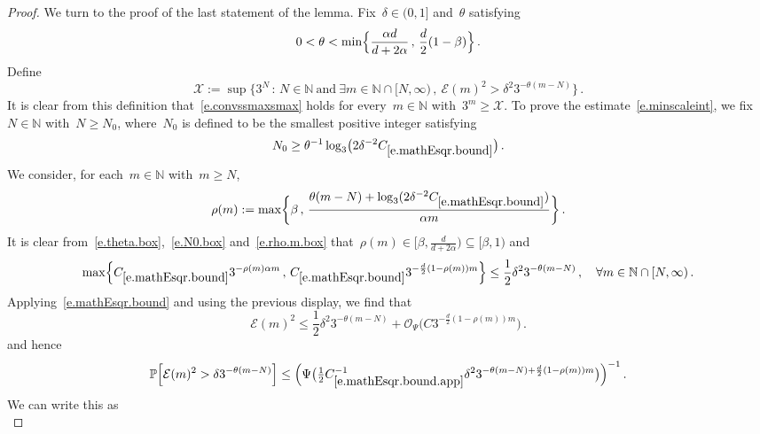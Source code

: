 \documentclass[11pt,twoside]{article} %
\numberwithin{equation}{section}
\theoremstyle{definition}
\newcommand*{\N}{\ensuremath{\mathbb{N}}}
\renewcommand{\P}{\mathbb{P}}
\newcommand{\X}{\mathcal{X}}
\renewcommand{\O}{\mathcal{O}}
\begin{document}
\begin{proof}
We turn to the proof of the last statement of the lemma. 
Fix~$\delta\in (0,1]$ and~$\theta$ satisfying 
\begin{equation}
\label{e.theta.box}
0 < \theta < 
\min \Bigl\{ 
\frac{\alpha d}{d+2\alpha} 
\,,\, 
\frac d2(1-\beta) 
\Bigr\}
\,. 
\end{equation}
Define 
\begin{equation}
\label{e.def.of.X}
\X := \sup\biggl\{ 3^N \,:\, 
N \in \N \ \mbox{and} \ 
\exists m\in\N \cap [N,\infty)
\,,\ \mathcal{E}(m)^2 >  \delta^2 3^{-\theta(m-N)}
\biggr\} \,.
\end{equation}
It is clear from this definition that~\eqref{e.convssmaxsmax} holds for every~$m\in \N$ with~$3^m\geq \X$. 
To prove the estimate~\eqref{e.minscaleint}, we 
fix~$N\in \N$ with~$N\geq N_0$, where~$N_0$ is defined to be the smallest positive integer satisfying 
\begin{equation}
\label{e.N0.box}
N_0 \geq \theta^{-1} \log_3 \bigl( 2 \delta^{-2} C_{\eqref{e.mathEsqr.bound}}\bigr)
\,.
\end{equation}
We consider, for each~$m\in\N$ with~$m\geq N$,
\begin{equation}
\label{e.rho.m.box}
\rho(m):= 
\max \biggl\{ 
\beta 
\, , \,
\frac{\theta(m-N)+\log_3 ( 2 \delta^{-2} C_{\eqref{e.mathEsqr.bound}})}{\alpha m}
\biggr\} \,.
\end{equation}
It is clear from~\eqref{e.theta.box},~\eqref{e.N0.box} and~\eqref{e.rho.m.box} that~$\rho(m) \in  [\beta, \frac{d}{d+2\alpha})\subseteq [\beta,1)$ and
\begin{equation*}
\max \Bigl\{ 
C_{\eqref{e.mathEsqr.bound}} 3^{-\rho(m) \alpha m }
\,,\, 
C_{\eqref{e.mathEsqr.bound}} 3^{-\frac d2(1-\rho(m)) m }
\Bigr\} 
\leq \frac12 \delta^2 3^{-\theta(m-N)} \,, \quad \forall m\in\N\cap [N,\infty)\,.
\end{equation*}
Applying~\eqref{e.mathEsqr.bound} and using the previous display, we find that 
\begin{equation}
\label{e.mathEsqr.bound.app}
\mathcal{E}(m)^2
\leq 
\frac12 \delta^2 3^{-\theta(m-N)}  + \O_\Psi\bigl( C 3^{-\frac d2(1-\rho(m))m} \bigr) 
\,.
\end{equation}
and hence 
\begin{equation*}
\P \Bigl[ \mathcal{E}(m)^2 >  \delta 3^{-\theta(m-N)} \Bigr] 
\leq 
\Bigl( \Psi \bigl( \tfrac 12 C_{\eqref{e.mathEsqr.bound.app}}^{-1} \delta^2 3^{-\theta (m-N)+\frac d2(1-\rho(m))m}\bigr) \Bigr)^{-1} 
\,.
\end{equation*}
We can write this as 
\begin{equation*}

\end{equation*}
\end{proof}
\end{document}
